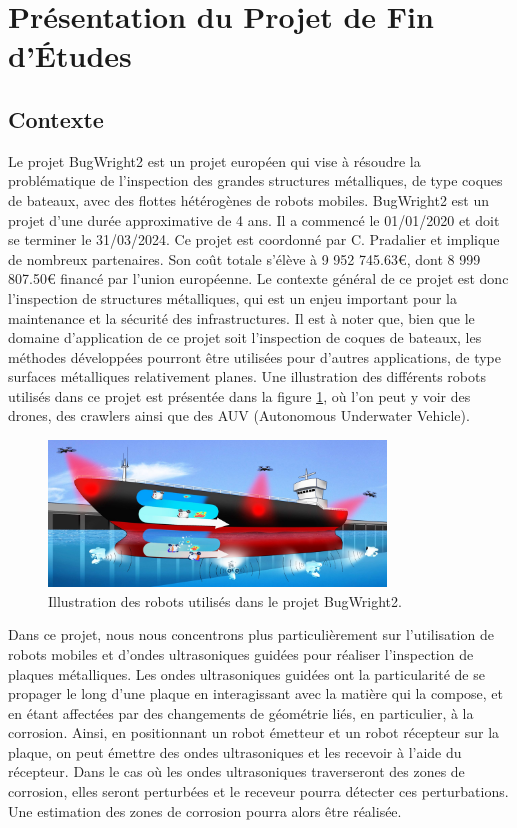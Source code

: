 \documentclass[init,francais,RandD]{rapportPFE}  %
\begin{document}
	\section{Présentation du Projet de Fin d'Études}
		\subsection{Contexte}
			Le projet BugWright2 est un projet européen qui vise à résoudre la problématique de l'inspection des grandes structures métalliques, de type coques de bateaux, avec des flottes hétérogènes de robots mobiles. BugWright2 est un projet d'une durée approximative de 4 ans. Il a commencé le 01/01/2020 et doit se terminer le 31/03/2024. Ce projet est coordonné par C. Pradalier et implique de nombreux partenaires. Son coût totale s'élève à 9 952 745.63\euro{}, dont 8 999 807.50\euro{} financé par l'union européenne. Le contexte général de ce projet est donc l'inspection de structures métalliques, qui est un enjeu important pour la maintenance et la sécurité des infrastructures. Il est à noter que, bien que le domaine d'application de ce projet soit l'inspection de coques de bateaux, les méthodes développées pourront être utilisées pour d'autres applications, de type surfaces métalliques relativement planes. Une illustration des différents robots utilisés dans ce projet est présentée dans la figure \ref{fig:cartoon}, où l'on peut y voir des drones, des crawlers ainsi que des AUV (Autonomous Underwater Vehicle).

			\begin{figure}[h]
				\centering
				\includegraphics[width=0.8\textwidth]{graphics/Concept-Cartoon-NJ3-e1582812224528.jpg}
				\caption{Illustration des robots utilisés dans le projet BugWright2.}
				\label{fig:cartoon}
			\end{figure}

			Dans ce projet, nous nous concentrons plus particulièrement sur l'utilisation de robots mobiles et d'ondes ultrasoniques guidées pour réaliser l'inspection de plaques métalliques. Les ondes ultrasoniques guidées ont la particularité de se propager le long d'une plaque en interagissant avec la matière qui la compose, et en étant affectées par des changements de géométrie liés, en particulier, à la corrosion. Ainsi, en positionnant un robot émetteur et un robot récepteur sur la plaque, on peut émettre des ondes ultrasoniques et les recevoir à l'aide du récepteur. Dans le cas où les ondes ultrasoniques traverseront des zones de corrosion, elles seront perturbées et le receveur pourra détecter ces perturbations. Une estimation des zones de corrosion pourra alors être réalisée.
\end{document}
